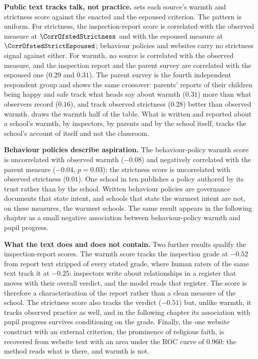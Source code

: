\textbf{Public text tracks talk, not practice.} 
sets each source's warmth and strictness score against the enacted and the
espoused criterion. The pattern is uniform. For strictness, the
inspection-report score is correlated with the observed measure at
$\CorrOfstedStrictness$ and with the espoused measure at
$\CorrOfstedStrictEspoused$; behaviour policies and websites carry no
strictness signal against either. For warmth, no source is correlated with
the observed measure, and the inspection report and the parent survey are
correlated with the espoused one ($0.29$ and $0.31$). The parent survey is
the fourth independent respondent group and shows the same crossover: parents'
reports of their children being happy and safe track what heads say about
warmth ($0.31$) more than what observers record ($0.16$), and track observed
strictness ($0.28$) better than observed warmth. 
draws the warmth half of the table. What is written and reported about a
school's warmth, by inspectors, by parents and by the school itself, tracks
the school's account of itself and not the classroom.



\textbf{Behaviour policies describe aspiration.} The behaviour-policy warmth
score is uncorrelated with observed warmth ($-0.08$) and negatively
correlated with the parent measure ($-0.04$, $p = 0.03$); the strictness score
is uncorrelated with observed strictness ($0.01$). One school in ten publishes
a policy authored by its trust rather than by the school. Written behaviour
policies are governance documents that state intent, and schools that state
the warmest intent are not, on these measures, the warmest schools. The same
result appears in the following chapter as a small negative association
between behaviour-policy warmth and pupil progress.

\textbf{What the text does and does not contain.} Two further results
qualify the inspection-report scores. The warmth score tracks the inspection
grade at $-0.52$ from report text stripped of every stated grade, where human
raters of the same text track it at $-0.25$: inspectors write about
relationships in a register that moves with their overall verdict, and the
model reads that register. The score is therefore a characterisation of the
report rather than a clean measure of the school. The strictness score also
tracks the verdict ($-0.51$) but, unlike warmth, it tracks observed practice
as well, and in the following chapter its association with pupil progress
survives conditioning on the grade. Finally, the one website construct with an
external criterion, the prominence of religious faith, is recovered from
website text with an area under the ROC curve of 0.960: the method reads what
is there, and warmth is not.

